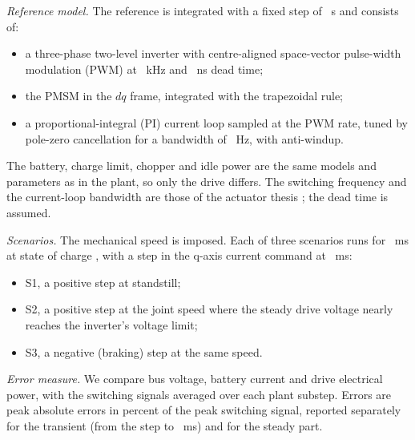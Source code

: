 \emph{Reference model.} The reference is integrated with a fixed step of ~\textmu s and consists of:
\begin{itemize}
\item a three-phase two-level inverter with centre-aligned space-vector pulse-width modulation (PWM) at ~kHz and ~ns dead time;
\item the PMSM in the $dq$ frame, integrated with the trapezoidal rule;
\item a proportional-integral (PI) current loop sampled at the PWM rate, tuned by pole-zero cancellation for a bandwidth of ~Hz, with anti-windup.
\end{itemize}
The battery, charge limit, chopper and idle power are the same models and parameters as in the plant, so only the drive differs. The switching frequency and the current-loop bandwidth are those of the actuator thesis \cite{katz2018actuator}; the dead time is assumed.

\emph{Scenarios.} The mechanical speed is imposed. Each of three scenarios runs for ~ms at state of charge , with a step in the q-axis current command at ~ms:
\begin{itemize}
\item S1, a positive step at standstill;
\item S2, a positive step at the joint speed where the steady drive voltage nearly reaches the inverter's voltage limit;
\item S3, a negative (braking) step at the same speed.
\end{itemize}

\emph{Error measure.} We compare bus voltage, battery current and drive electrical power, with the switching signals averaged over each plant substep. Errors are peak absolute errors in percent of the peak switching signal, reported separately for the transient (from the step to ~ms) and for the steady part.

